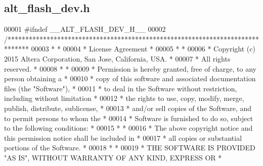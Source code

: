 \subsection{alt\+\_\+flash\+\_\+dev.\+h}
\label{alt__flash__dev_8h_source}

\begin{DoxyCode}
00001 \textcolor{preprocessor}{#ifndef \_\_ALT\_FLASH\_DEV\_H\_\_}
00002 \textcolor{comment}{/******************************************************************************}
00003 \textcolor{comment}{*                                                                             *}
00004 \textcolor{comment}{* License Agreement                                                           *}
00005 \textcolor{comment}{*                                                                             *}
00006 \textcolor{comment}{* Copyright (c) 2015 Altera Corporation, San Jose, California, USA.           *}
00007 \textcolor{comment}{* All rights reserved.                                                        *}
00008 \textcolor{comment}{*                                                                             *}
00009 \textcolor{comment}{* Permission is hereby granted, free of charge, to any person obtaining a     *}
00010 \textcolor{comment}{* copy of this software and associated documentation files (the "Software"),  *}
00011 \textcolor{comment}{* to deal in the Software without restriction, including without limitation   *}
00012 \textcolor{comment}{* the rights to use, copy, modify, merge, publish, distribute, sublicense,    *}
00013 \textcolor{comment}{* and/or sell copies of the Software, and to permit persons to whom the       *}
00014 \textcolor{comment}{* Software is furnished to do so, subject to the following conditions:        *}
00015 \textcolor{comment}{*                                                                             *}
00016 \textcolor{comment}{* The above copyright notice and this permission notice shall be included in  *}
00017 \textcolor{comment}{* all copies or substantial portions of the Software.                         *}
00018 \textcolor{comment}{*                                                                             *}
00019 \textcolor{comment}{* THE SOFTWARE IS PROVIDED "AS IS", WITHOUT WARRANTY OF ANY KIND, EXPRESS OR  *}

\end{DoxyCode}
